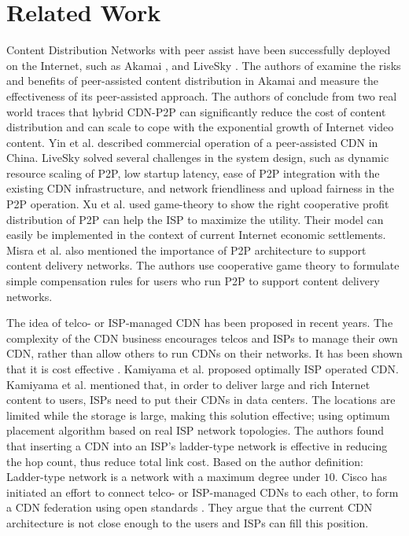 \documentclass[10pt,final,journal,a4paper]{IEEEtran}
\begin{document}
\section{Related Work}\label{relatedwork}
Content Distribution Networks with peer assist have been successfully deployed on the Internet, such as Akamai \cite{Zhao:2013:PCD:2504730.2504752}, \cite{Huang:2008:UHC:1496046.1496064} and LiveSky \cite{Yin:2010:LEC:1823746.1823750}.  
The authors of \cite{Zhao:2013:PCD:2504730.2504752} examine the risks and benefits of peer-assisted content distribution in Akamai and measure the effectiveness of its peer-assisted approach. 
The authors of \cite{Huang:2008:UHC:1496046.1496064} conclude from two real world traces that hybrid CDN-P2P can significantly reduce the cost of content distribution and can scale to cope with the exponential growth of Internet video content.  
Yin et al. \cite{Yin:2010:LEC:1823746.1823750} described commercial operation of a peer-assisted CDN in China.  
LiveSky solved several challenges in the system design, such as dynamic resource scaling of P2P, low startup latency, ease of P2P integration with the existing CDN infrastructure, and network friendliness and upload fairness in the P2P operation.  
Xu et al.\cite{DBLP:journals/corr/abs-1212-4915} used game-theory to show the right cooperative profit distribution of P2P can help the ISP to maximize the utility.  
Their model can easily be implemented in the context of current Internet economic settlements.  
Misra et al.\cite{Misra:2010:IPS:1811099.1811064} also mentioned the importance of P2P architecture to support content delivery networks.
The authors use cooperative game theory to formulate simple compensation rules for users who run P2P to support content delivery networks.

The idea of telco- or ISP-managed CDN has been proposed in recent years.  
The complexity of the CDN business encourages telcos and ISPs to manage their own CDN, rather than allow others to run CDNs on their networks.  
It has been shown that it is cost effective \cite{federation}\cite{norton2011internet}. 
Kamiyama et al. \cite{NoriakiKAMIYAMA2013} proposed optimally ISP operated CDN.
Kamiyama et al. mentioned that, in order to deliver large and rich Internet content to users, ISPs need to put their CDNs in data centers.  
The locations are limited while the storage is large, making this solution effective; using optimum placement algorithm based on real ISP network topologies.  
The authors found that inserting a CDN into an ISP's ladder-type network is effective in reducing the hop count, thus reduce total link cost.  
Based on the author definition: Ladder-type network is a network with a maximum degree under $10$.
Cisco has initiated an effort to connect telco- or ISP-managed CDNs to each other, to form a CDN federation \cite{federation} using open standards \cite{cdni}.  
They argue that the current CDN architecture is not close enough to the users and ISPs can fill this position.
\end{document}
